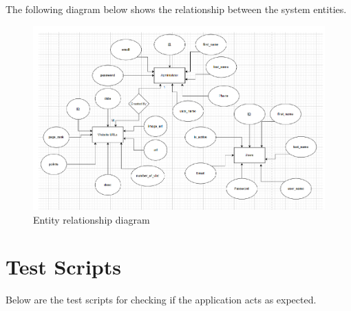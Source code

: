 \documentclass{scrartcl}
\begin{document}
The following diagram below shows the relationship between the system entities.

\begin{figure}[H]
  \begin{center}
    \caption{Entity relationship diagram}
    \includegraphics[scale=0.95]{erd-diagram.png}
  \end{center}
\end{figure}

\section{Test Scripts}

Below are the test scripts for checking if the application acts as expected.
\end{document}
